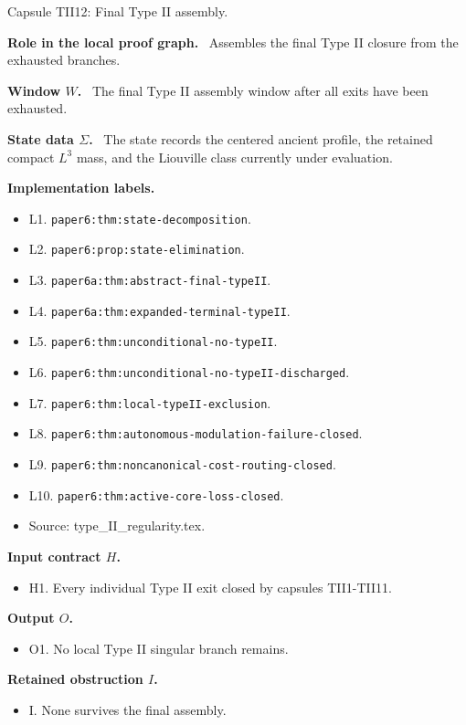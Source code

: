 \documentclass[11pt]{amsart}
\newcommand{\capsulefield}[1]{\par\smallskip\noindent\textbf{#1.}\ }
\begin{document}
\begin{proofcapsule}{Capsule TII12: Final Type II assembly.}
  \capsulefield{Role in the local proof graph}
  Assembles the final Type II closure from the exhausted branches.

  \capsulefield{Window \(W\)}
The final Type II assembly window after all exits have been exhausted.

  \capsulefield{State data \(\Sigma\)}
The state records the centered ancient profile, the retained compact $L^3$ mass, and the Liouville class currently under evaluation.

  \capsulefield{Implementation labels}
  \begin{itemize}[leftmargin=1.8em]
  \item L1. \texttt{paper6:thm:state-decomposition}.
  \item L2. \texttt{paper6:prop:state-elimination}.
  \item L3. \texttt{paper6a:thm:abstract-final-typeII}.
  \item L4. \texttt{paper6a:thm:expanded-terminal-typeII}.
  \item L5. \texttt{paper6:thm:unconditional-no-typeII}.
  \item L6. \texttt{paper6:thm:unconditional-no-typeII-discharged}.
  \item L7. \texttt{paper6:thm:local-typeII-exclusion}.
  \item L8. \texttt{paper6:thm:autonomous-modulation-failure-closed}.
  \item L9. \texttt{paper6:thm:noncanonical-cost-routing-closed}.
  \item L10. \texttt{paper6:thm:active-core-loss-closed}.
  \item Source: type\_II\_regularity.tex.
  \end{itemize}

  \capsulefield{Input contract \(H\)}
  \begin{itemize}[leftmargin=1.8em]
  \item H1. Every individual Type II exit closed by capsules TII1-TII11.
  \end{itemize}

  \capsulefield{Output \(O\)}
  \begin{itemize}[leftmargin=1.8em]
  \item O1. No local Type II singular branch remains.
  \end{itemize}

  \capsulefield{Retained obstruction \(I\)}
  \begin{itemize}[leftmargin=1.8em]
  \item I. None survives the final assembly.
  \end{itemize}


\end{proofcapsule}
\end{document}
